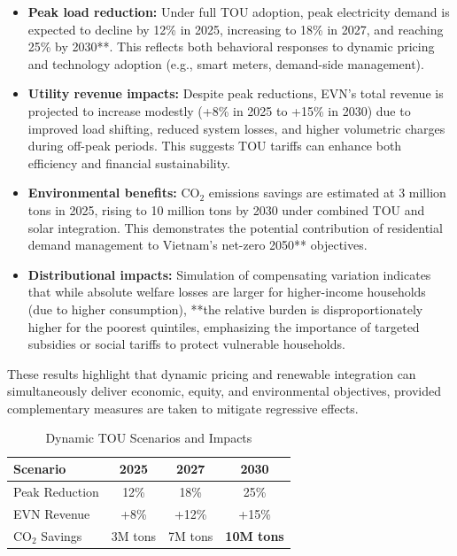 \documentclass[12pt,a4paper]{article}
\begin{document}
	\begin{itemize}
		\item \textbf{Peak load reduction:} Under full TOU adoption, peak electricity demand is expected to decline by 12\% in 2025, increasing to 18\% in 2027, and reaching 25\% by 2030**. This reflects both behavioral responses to dynamic pricing and technology adoption (e.g., smart meters, demand-side management).  
		\item \textbf{Utility revenue impacts:} Despite peak reductions, EVN's total revenue is projected to increase modestly (+8\% in 2025 to +15\% in 2030) due to improved load shifting, reduced system losses, and higher volumetric charges during off-peak periods. This suggests TOU tariffs can enhance both efficiency and financial sustainability.  
		\item \textbf{Environmental benefits:} CO$_2$ emissions savings are estimated at 3 million tons in 2025, rising to 10 million tons by 2030 under combined TOU and solar integration. This demonstrates the potential contribution of residential demand management to Vietnam’s net-zero 2050** objectives.  
		\item \textbf{Distributional impacts:} Simulation of compensating variation indicates that while absolute welfare losses are larger for higher-income households (due to higher consumption), **the relative burden is disproportionately higher for the poorest quintiles, emphasizing the importance of targeted subsidies or social tariffs to protect vulnerable households.  
	\end{itemize}
	
	These results highlight that dynamic pricing and renewable integration can simultaneously deliver economic, equity, and environmental objectives, provided complementary measures are taken to mitigate regressive effects.
		
	\begin{table}[H]
		\centering
		\caption{Dynamic TOU Scenarios and Impacts}
		\label{tab:policy}
		\begin{tabular}{lccc}
			\toprule
			Scenario & 2025 & 2027 & 2030 \\
			\midrule
			Peak Reduction & 12\% & 18\% & 25\% \\
			EVN Revenue & +8\% & +12\% & +15\% \\
			CO$_2$ Savings & 3M tons & 7M tons & \textbf{10M tons} \\
			\bottomrule
		\end{tabular}
	\end{table}
	
\end{document}
